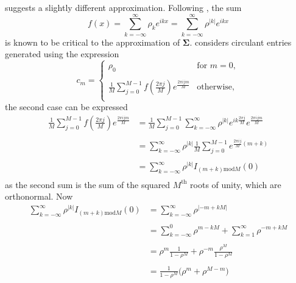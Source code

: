 \documentclass[letterpaper,12pt,oneside,final]{article}
\newcommand{\sm}[1]{\boldsymbol{#1}}   %
\newcommand{\abs}[1]{\lvert{#1}\rvert}              %
\newcommand{\ind}[2]{I_{#2} \left( #1 \right)}
\begin{document}
\cite{gray2006toeplitz} suggests a slightly different approximation. Following \cite{grenanderszego1958}, the sum
$$f(x) = \sum_{k = -\infty}^{\infty} \rho_k e^{ikx} = \sum_{k = -\infty}^{\infty} \rho^{\abs{k}} e^{ikx}$$
is known to be critical to the approximation of $\sm{\Sigma}$. \cite{gray2006toeplitz} considers circulant entries generated using the expression
\begin{equation} \label{eq:multipleTesting:grayEq}
  c_m = \begin{cases}
    \rho_0 & \text{for } m = 0, \\
    & \\
    \frac{1}{M} \sum_{j = 0}^{M-1} f\left ( \frac{2\pi j}{M} \right ) e^{\frac{2 \pi i j m}{M}} & \text{otherwise}, \\
  \end{cases}
\end{equation}
the second case can be expressed
\begin{equation*}
  \begin{aligned}
    \frac{1}{M} \sum_{j = 0}^{M-1} f\left ( \frac{2\pi j}{M} \right ) e^{\frac{2 \pi i j m}{M}} & = \frac{1}{M} \sum_{j = 0}^{M-1} \sum_{k = -\infty}^{\infty} \rho^{\abs{k}} e^{ik \frac{2\pi j}{M}} e^{\frac{2 \pi i j m}{M}} \\
    & \\
    & = \sum_{k = -\infty}^{\infty} \rho^{\abs{k}} \frac{1}{M} \sum_{j = 0}^{M-1} e^{\frac{2 \pi i j}{M}(m+k)} \\
    & \\
    & = \sum_{k = -\infty}^{\infty} \rho^{\abs{k}} \ind{0}{(m+k)\text{mod} M} \\
  \end{aligned}
\end{equation*}
as the second sum is the sum of the squared $M^{\text{th}}$ roots of unity, which are orthonormal. Now
\begin{equation*}
  \begin{aligned}
    \sum_{k = -\infty}^{\infty} \rho^{\abs{k}} \ind{0}{(m+k)\text{mod} M} & = \sum_{k = -\infty}^{\infty} \rho^{\abs{-m + kM}} \\
    & \\
    & = \sum_{k = -\infty}^0 \rho^{m - kM} + \sum_{k = 1}^{\infty} \rho^{- m + kM} \\
    & \\
    & = \rho^m \frac{1}{1 - \rho^M} + \rho^{-m} \frac{\rho^M}{1 - \rho^M} \\
    & \\
    & = \frac{1}{1 - \rho^M} \big ( \rho^m + \rho^{M-m} \big ) \\
  \end{aligned}
\end{equation*}
\end{document}
